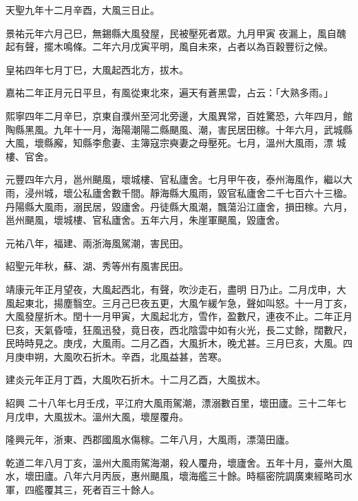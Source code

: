 \begin{pinyinscope}
 天聖九年十二月辛酉，大風三日止。



 景祐元年六月己巳，無錫縣大風發屋，民被壓死者眾。九月甲寅
 夜漏上，風自醜起有聲，擺木鳴條。二年六月戊寅平明，風自未來，占者以為百穀豐衍之候。



 皇祐四年七月丁巳，大風起西北方，拔木。



 嘉祐二年正月元日平旦，有風從東北來，遍天有蒼黑雲，占云：「大熟多雨。」



 熙寧四年二月辛巳，京東自濮州至河北旁邊，大風異常，百姓驚恐，六年四月，館陶縣黑風。九年十一月，海陽潮陽二縣颶風、潮，害民居田稼。十年六月，武城縣大風，壞縣廨，知縣李愈妻、主簿寇宗奭妻之母壓死。七月，溫州大風雨，漂
 城樓、官舍。



 元豐四年六月，邕州颶風，壞城樓、官私廬舍。七月甲午夜，泰州海風作，繼以大雨，浸州城，壞公私廬舍數千間。靜海縣大風雨，毀官私廬舍二千七百六十三楹。丹陽縣大風雨，溺民居，毀廬舍。丹徒縣大風潮，飄蕩沿江廬舍，損田稼。六月，邕州颶風，壞城樓、官私廬舍。五年六月，朱崖軍颶風，毀廬舍。



 元祐八年，福建、兩浙海風駕潮，害民田。



 紹聖元年秋，蘇、湖、秀等州有風害民田。



 靖康元年正月望夜，大風起西北，有聲，吹沙走石，盡明
 日乃止。二月戊申，大風起東北，揚塵翳空。三月己巳夜五更，大風乍緩乍急，聲如叫怒。十一月丁亥，大風發屋折木。閏十一月甲寅，大風起北方，雪作，盈數尺，連夜不止。二年正月巳亥，天氣昏噎，狂風迅發，竟日夜，西北陰雲中如有火光，長二丈餘，闊數尺，民時時見之。庚戌，大風雨。二月乙酉，大風折木，晚尤甚。三月巳亥，大風。四月庚申朔，大風吹石折木。辛酉，北風益甚，苦寒。



 建炎元年正月丁酉，大風吹石折木。十二月乙酉，大風拔木。



 紹興
 二十八年七月壬戌，平江府大風雨駕潮，漂溺數百里，壞田廬。三十二年七月戊申，大風拔木。溫州大風，壞屋覆舟。



 隆興元年，浙東、西郡國風水傷稼。二年八月，大風雨，漂蕩田廬。



 乾道二年八月丁亥，溫州大風雨駕海潮，殺人覆舟，壞廬舍。五年十月，臺州大風水，壞田廬。八年六月丙辰，惠州颶風，壞海艦三十餘。時樞密院調廣東經略司水軍，四艦覆其三，死者百三十餘人。




\end{pinyinscope}
